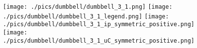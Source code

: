 \documentclass{standalone}
\begin{document}
  \begin{minipage}[t]{\textwidth}

  \begin{figure}
      \centering
      \texttt{[image: ./pics/dumbbell/dumbbell\_3\_1.png]}
      \qquad
      \texttt{[image: ./pics/dumbbell/dumbbell\_3\_1\_legend.png]}
      \vfill
      \texttt{[image: ./pics/dumbbell/dumbbell\_3\_1\_ip\_symmetric\_positive.png]}
      \qquad
      \texttt{[image: ./pics/dumbbell/dumbbell\_3\_1\_uC\_symmetric\_positive.png]}
  \end{figure}

  \end{minipage}
\end{document}
